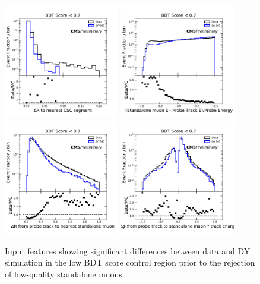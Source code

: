 \begin{figure}[htbp]
	\label{fig:lowScoreVariableMismatch}
	\centering
	\includegraphics[width=0.45\textwidth]{figures/badPartialRegioncscDR.pdf}
	\hspace{0.01\textwidth}
	\includegraphics[width=0.45\textwidth]{figures/badPartialRegionstandaloneDEoverE.pdf}
	\vspace{0.01\textwidth}
	\includegraphics[width=0.45\textwidth]{figures/badPartialRegionstaDR.pdf}
	\hspace{0.01\textwidth}
	\includegraphics[width=0.45\textwidth]{figures/badPartialRegionstaPhi.pdf} 
        \caption[Low-Score Event Validation Before Correction]{Input features showing significant differences between data and DY simulation in the low BDT score control region prior to the rejection of low-quality standalone muons.}
\end{figure}

